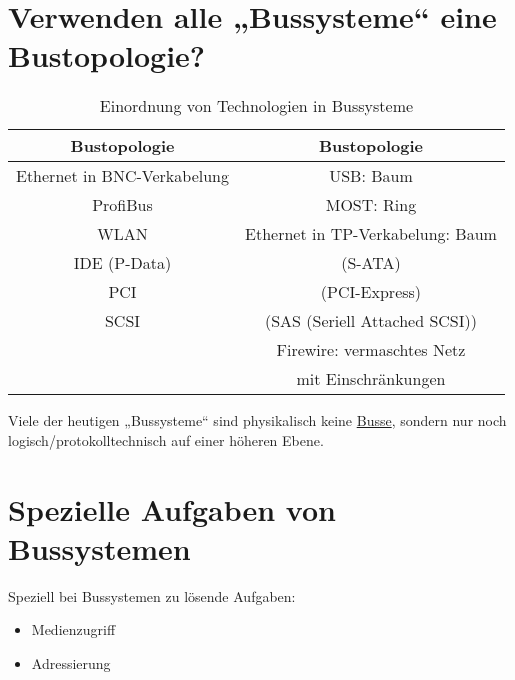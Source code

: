 \section{Verwenden alle „Bussysteme“ eine Bustopologie?}
\begin{table}[h]
\centering
\begin{tabular}{c|c}
\textbf{Bustopologie} & \textbf{Bustopologie} \\ 
\hline 
Ethernet in BNC-Verkabelung & USB: Baum \\ 
\hline 
ProfiBus & MOST: Ring \\ 
\hline 
WLAN & Ethernet in TP-Verkabelung: Baum \\ 
\hline
IDE (P-Data) & (S-ATA)\\
\hline
PCI & (PCI-Express)\\
\hline
SCSI & (SAS (Seriell Attached SCSI))\\
\hline
 & Firewire: vermaschtes Netz\\
 & mit Einschränkungen
\end{tabular}
\caption{Einordnung von Technologien in Bussysteme}
\label{tab:bussystem_or_not}
\end{table} 
Viele der heutigen „Bussysteme“ sind physikalisch keine \underline{Busse}, sondern nur noch logisch/protokolltechnisch auf einer höheren Ebene.



\section{Spezielle Aufgaben von Bussystemen}
\label{sec:spezielle_Aufgaben_Bussysteme}
Speziell bei Bussystemen zu lösende Aufgaben:
\begin{itemize}
\item Medienzugriff
\item Adressierung
\end{itemize}


